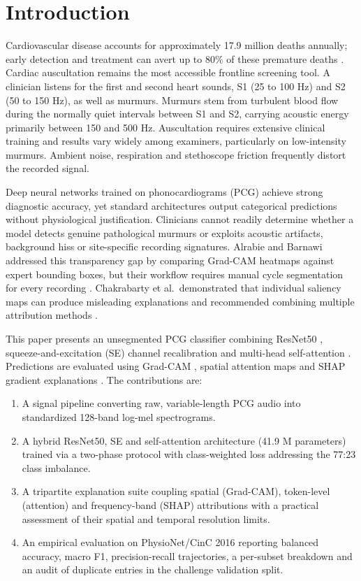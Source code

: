\documentclass[conference]{IEEEtran}
\begin{document}
\section{Introduction}
Cardiovascular disease accounts for approximately 17.9 million deaths annually; early detection and treatment can avert up to 80\% of these premature deaths \cite{who_cvd}. Cardiac auscultation remains the most accessible frontline screening tool. A clinician listens for the first and second heart sounds, S1 (25 to 100 Hz) and S2 (50 to 150 Hz), as well as murmurs. Murmurs stem from turbulent blood flow during the normally quiet intervals between S1 and S2, carrying acoustic energy primarily between 150 and 500 Hz. Auscultation requires extensive clinical training and results vary widely among examiners, particularly on low-intensity murmurs. Ambient noise, respiration and stethoscope friction frequently distort the recorded signal.

Deep neural networks trained on phonocardiograms (PCG) achieve strong diagnostic accuracy, yet standard architectures output categorical predictions without physiological justification. Clinicians cannot readily determine whether a model detects genuine pathological murmurs or exploits acoustic artifacts, background hiss or site-specific recording signatures. Alrabie and Barnawi addressed this transparency gap by comparing Grad-CAM heatmaps against expert bounding boxes, but their workflow requires manual cycle segmentation for every recording \cite{alrabie}. Chakrabarty et al.\ demonstrated that individual saliency maps can produce misleading explanations and recommended combining multiple attribution methods \cite{chakrabarty}.

This paper presents an unsegmented PCG classifier combining ResNet50 \cite{he}, squeeze-and-excitation (SE) channel recalibration \cite{hu} and multi-head self-attention \cite{vaswani}. Predictions are evaluated using Grad-CAM \cite{selvaraju}, spatial attention maps and SHAP gradient explanations \cite{lundberg}. The contributions are:
\begin{enumerate}
\item A signal pipeline converting raw, variable-length PCG audio into standardized 128-band log-mel spectrograms.
\item A hybrid ResNet50, SE and self-attention architecture (41.9 M parameters) trained via a two-phase protocol with class-weighted loss addressing the 77:23 class imbalance.
\item A tripartite explanation suite coupling spatial (Grad-CAM), token-level (attention) and frequency-band (SHAP) attributions with a practical assessment of their spatial and temporal resolution limits.
\item An empirical evaluation on PhysioNet/CinC 2016 reporting balanced accuracy, macro F1, precision-recall trajectories, a per-subset breakdown and an audit of duplicate entries in the challenge validation split.
\end{enumerate}
\end{document}
